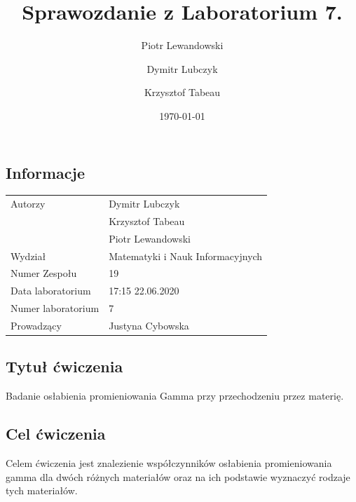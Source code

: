 \documentclass{article}
\title{Sprawozdanie z Laboratorium 7.}
\author{Piotr Lewandowski \and Dymitr Lubczyk \and Krzysztof Tabeau }
\date{\today}
\begin{document}
\maketitle

\subsection{Informacje}
\begin{tabular}{|l|l|}
\hline
Autorzy             & Dymitr Lubczyk                    \\
                    & Krzysztof Tabeau                  \\
                    & Piotr Lewandowski                 \\
Wydział             & Matematyki i Nauk Informacyjnych  \\
Numer Zespołu       & 19                                \\
Data laboratorium   & 17:15 22.06.2020                  \\
Numer laboratorium  & 7                                 \\
Prowadzący          & Justyna Cybowska         \\
\hline
\end{tabular}
\subsection{Tytuł ćwiczenia}
Badanie osłabienia promieniowania Gamma przy przechodzeniu przez materię.

\subsection{Cel ćwiczenia}
Celem ćwiczenia jest znalezienie współczynników osłabienia promieniowania gamma dla dwóch różnych materiałów oraz na ich podstawie wyznaczyć rodzaje tych materiałów. 
\clearpage
\end{document}
